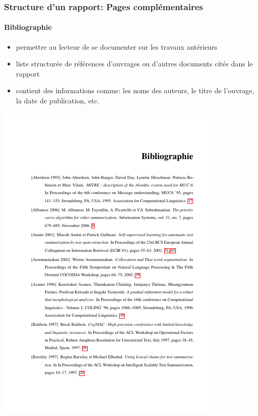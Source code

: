 \documentclass[xcolor=table]{beamer}
\begin{document}
\begin{frame}
\frametitle{Structure d'un rapport: Pages complémentaires}
\framesubtitle{Bibliographie}

\begin{minipage}{0.60\textwidth}
	\begin{itemize}
		\item permettre au lecteur de se documenter sur les travaux antérieurs
		\item liste structurée de références d'ouvrages ou d'autres documents cités dans le rapport
		\item contient des informations comme: les noms des auteurs, le titre de l'ouvrage, la date de publication, etc.
	\end{itemize}
\end{minipage}
\begin{minipage}{0.38\textwidth}
	\includegraphics[width=\textwidth,frame]{..//img/Bweb03-redaction/bibliographie.png}
\end{minipage}

\end{frame}
\end{document}
